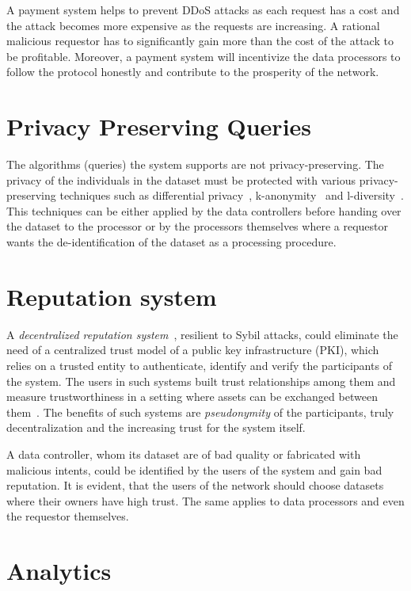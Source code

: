 A payment system helps to prevent DDoS attacks as each request has a cost and the attack becomes more expensive as the requests are increasing. A rational malicious requestor has to significantly gain more than the cost of the attack to be profitable. Moreover, a payment system will incentivize the data processors to follow the protocol honestly and contribute to the prosperity of the network.

\section{Privacy Preserving Queries}
\label{future_work:ppq}

The algorithms (queries) the system supports are not privacy-preserving. The privacy of the individuals in the dataset must be protected with various privacy-preserving techniques such as differential privacy~\cite{differential_privacy}, k-anonymity~\cite{Samarati98protectingprivacy} and l-diversity~\cite{Aggarwal2008}. This techniques can be either applied by the data controllers before handing over the dataset to the processor or by the processors themselves where a requestor wants the de-identification of the dataset as a processing procedure.

\section{Reputation system}
\label{future_work:ranking_system}

A \textit{decentralized reputation system}~\cite{trust_is_risk}, resilient to Sybil attacks, could eliminate the need of a centralized trust model of a public key infrastructure (PKI), which relies on a trusted entity to authenticate, identify and verify the participants of the system. The users in such systems built trust relationships among them and measure trustworthiness in a setting where assets can be exchanged between them~\cite{trust_is_risk}. The benefits of such systems are \textit{pseudonymity} of the participants, truly decentralization and the increasing trust for the system itself.

A data controller, whom its dataset are of bad quality or fabricated with malicious intents, could be identified by the users of the system and gain bad reputation. It is evident, that the users of the network should choose datasets where their owners have high trust. The same applies to data processors and even the requestor themselves.

\section{Analytics}
\label{future_work:analytics}

